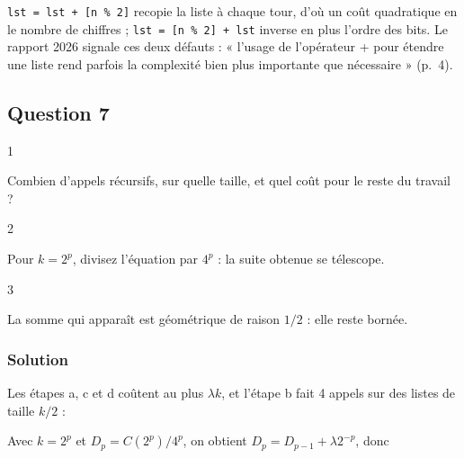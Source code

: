 \documentclass[11pt,a4paper]{article}
\newcommand{\equationajustee}[1]{%
  \sbox{\boiteequation}{$\displaystyle #1$}%
  \ifdim\wd\boiteequation>\linewidth
    \[\resizebox{\linewidth}{!}{\usebox{\boiteequation}}\]%
  \else
    \[#1\]%
  \fi}
\begin{document}
\begin{piege}

\texttt{lst\ =\allowbreak{}\ lst\ +\ {[}n\ \%\ 2{]}\allowbreak{}} recopie la liste à chaque tour, d'où un coût quadratique en le nombre de chiffres ; \texttt{lst\ =\allowbreak{}\ {[}n\ \%\ 2{]}\allowbreak{}\ +\ lst} inverse en plus l'ordre des bits. Le rapport 2026 signale ces deux défauts : « l'usage de l'opérateur + pour étendre une liste rend parfois la complexité bien plus importante que nécessaire » (p.~4).

\end{piege}

\hypertarget{question-7}{%
\subsection{Question 7}\label{question-7}}

\begin{indication}{1}

Combien d'appels récursifs, sur quelle taille, et quel coût pour le reste du travail ?

\end{indication}

\begin{indication}{2}

Pour \(k = 2^p\), divisez l'équation par \(4^p\) : la suite obtenue se télescope.

\end{indication}

\begin{indication}{3}

La somme qui apparaît est géométrique de raison \(1/2\) : elle reste bornée.

\end{indication}

\hypertarget{solution-6}{%
\subsubsection{Solution}\label{solution-6}}

Les étapes a, c et d coûtent au plus \(\lambda k\), et l'étape b fait 4 appels sur des listes de taille \(k/2\) :

\equationajustee{\begin{aligned}
C(k) &= 4\,C(k/2) + \lambda k, \\
C(1) &= c_0.
\end{aligned}}

Avec \(k = 2^p\) et \(D_p = C(2^p)/4^p\), on obtient \(D_p = D_{p-1} + \lambda 2^{-p}\), donc
\end{document}
